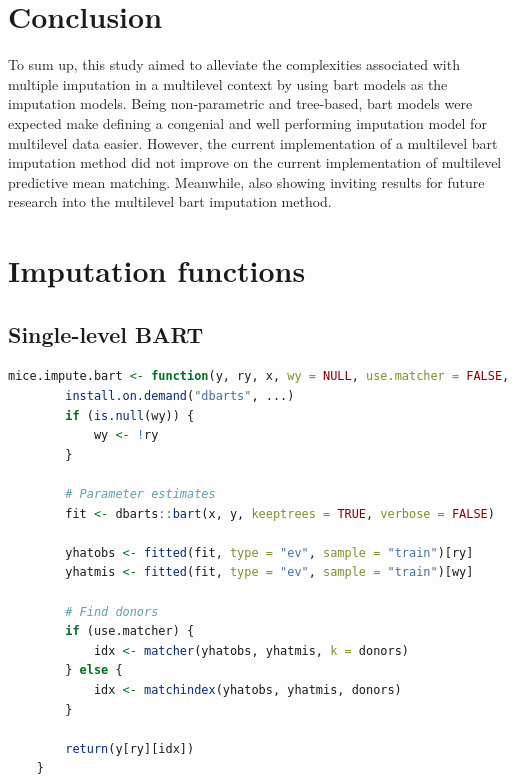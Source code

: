 \documentclass[10pt, a4paper, titlepage]{article}
\begin{document}
\section{Conclusion}

To sum up, this study aimed to alleviate the complexities associated with multiple imputation in a multilevel context by using bart models as the imputation models. Being non-parametric and tree-based, bart models were expected make defining a congenial and well performing imputation model for multilevel data easier. However, the current implementation of a multilevel bart imputation method did not improve on the current implementation of multilevel predictive mean matching. Meanwhile, also showing inviting results for future research into the multilevel bart imputation method.

\newpage



\newpage
\appendix
\section{Imputation functions} \label{appendix:imputationfunctions}
\subsection{Single-level BART}
\begin{lstlisting}[language=R, caption = {Imputation function for single-level BART}, label = {lst:singlelevelBART}]
    mice.impute.bart <- function(y, ry, x, wy = NULL, use.matcher = FALSE, donors = 5L, ...) {
        install.on.demand("dbarts", ...)
        if (is.null(wy)) {
            wy <- !ry
        }
    
        # Parameter estimates
        fit <- dbarts::bart(x, y, keeptrees = TRUE, verbose = FALSE)
    
        yhatobs <- fitted(fit, type = "ev", sample = "train")[ry]
        yhatmis <- fitted(fit, type = "ev", sample = "train")[wy]
    
        # Find donors
        if (use.matcher) {
            idx <- matcher(yhatobs, yhatmis, k = donors)
        } else {
            idx <- matchindex(yhatobs, yhatmis, donors)
        }
    
        return(y[ry][idx])
    }
\end{lstlisting}
\end{document}
